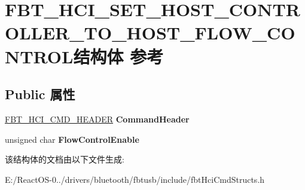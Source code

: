 \hypertarget{struct_f_b_t___h_c_i___s_e_t___h_o_s_t___c_o_n_t_r_o_l_l_e_r___t_o___h_o_s_t___f_l_o_w___c_o_n_t_r_o_l}{}\section{F\+B\+T\+\_\+\+H\+C\+I\+\_\+\+S\+E\+T\+\_\+\+H\+O\+S\+T\+\_\+\+C\+O\+N\+T\+R\+O\+L\+L\+E\+R\+\_\+\+T\+O\+\_\+\+H\+O\+S\+T\+\_\+\+F\+L\+O\+W\+\_\+\+C\+O\+N\+T\+R\+O\+L结构体 参考}
\label{struct_f_b_t___h_c_i___s_e_t___h_o_s_t___c_o_n_t_r_o_l_l_e_r___t_o___h_o_s_t___f_l_o_w___c_o_n_t_r_o_l}
\subsection*{Public 属性}
\begin{DoxyCompactItemize}
\item 
\mbox{\label{struct_f_b_t___h_c_i___s_e_t___h_o_s_t___c_o_n_t_r_o_l_l_e_r___t_o___h_o_s_t___f_l_o_w___c_o_n_t_r_o_l_a48bd32cb8173c22efe4b7bed80fe94bd}} 
\hyperlink{struct_f_b_t___h_c_i___c_m_d___h_e_a_d_e_r}{F\+B\+T\+\_\+\+H\+C\+I\+\_\+\+C\+M\+D\+\_\+\+H\+E\+A\+D\+ER} {\bfseries Command\+Header}
\item 
\mbox{\label{struct_f_b_t___h_c_i___s_e_t___h_o_s_t___c_o_n_t_r_o_l_l_e_r___t_o___h_o_s_t___f_l_o_w___c_o_n_t_r_o_l_a9d2199d95d61a9e87ef9a0996f3285fa}} 
unsigned char {\bfseries Flow\+Control\+Enable}
\end{DoxyCompactItemize}


该结构体的文档由以下文件生成\+:\begin{DoxyCompactItemize}
\item 
E\+:/\+React\+O\+S-\/0../drivers/bluetooth/fbtusb/include/fbt\+Hci\+Cmd\+Structs.\+h\end{DoxyCompactItemize}
